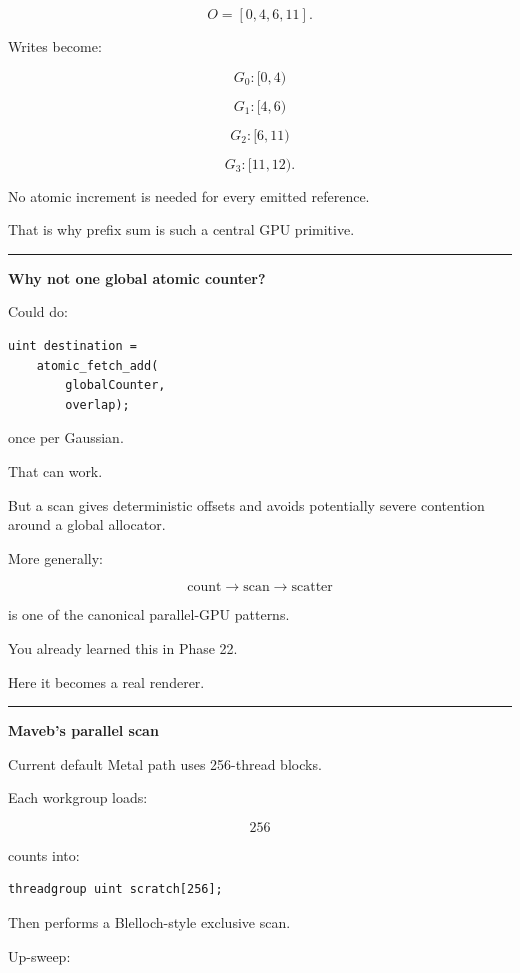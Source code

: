 \[
O=
[0,4,6,11].
\]

Writes become:

\[
G_0:[0,4)
\]

\[
G_1:[4,6)
\]

\[
G_2:[6,11)
\]

\[
G_3:[11,12).
\]

No atomic increment is needed for every emitted reference.

That is why prefix sum is such a central GPU primitive.

\begin{center}\rule{0.5\linewidth}{0.5pt}\end{center}

\textbf{Why not one global atomic counter?}

Could do:

\begin{verbatim}
uint destination =
    atomic_fetch_add(
        globalCounter,
        overlap);
\end{verbatim}

once per Gaussian.

That can work.

But a scan gives deterministic offsets and avoids potentially severe contention around a global allocator.

More generally:

\[
\boxed{
\text{count}
\rightarrow
\text{scan}
\rightarrow
\text{scatter}
}
\]

is one of the canonical parallel-GPU patterns.

You already learned this in Phase 22.

Here it becomes a real renderer.

\begin{center}\rule{0.5\linewidth}{0.5pt}\end{center}

\textbf{Maveb's parallel scan}

Current default Metal path uses 256-thread blocks.

Each workgroup loads:

\[
256
\]

counts into:

\begin{verbatim}
threadgroup uint scratch[256];
\end{verbatim}

Then performs a Blelloch-style exclusive scan.

Up-sweep:

